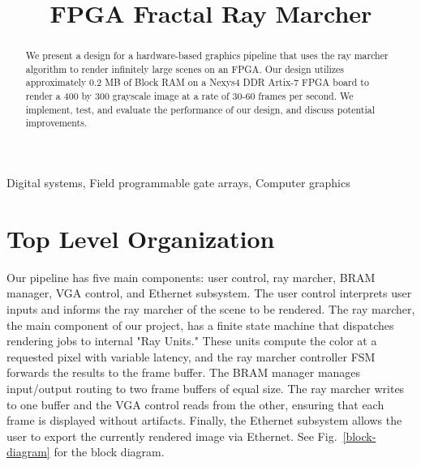 \documentclass[conference]{IEEEtran}
\begin{document}
\title{FPGA Fractal Ray Marcher}

\author{
\and
{}
}

\maketitle

\begin{abstract}
We present a design for a hardware-based graphics pipeline that uses the ray marcher algorithm to render infinitely large scenes on an FPGA. Our design utilizes approximately 0.2 MB of Block RAM on a Nexys4 DDR Artix-7 FPGA board to render a 400 by 300 grayscale image at a rate of 30-60 frames per second. We implement, test, and evaluate the performance of our design, and discuss potential improvements.
\end{abstract}

\begin{IEEEkeywords}
Digital systems, Field programmable gate arrays, Computer graphics
\end{IEEEkeywords}


\section{Top Level Organization}

Our pipeline has five main components: user control, ray marcher, BRAM manager, VGA control, and Ethernet subsystem. The user control interprets user inputs and informs the ray marcher of the scene to be rendered. The ray marcher, the main component of our project, has a finite state machine that dispatches rendering jobs to internal "Ray Units." These units compute the color at a requested pixel with variable latency, and the ray marcher controller FSM forwards the results to the frame buffer. The BRAM manager manages input/output routing to two frame buffers of equal size. The ray marcher writes to one buffer and the VGA control reads from the other, ensuring that each frame is displayed without artifacts. Finally, the Ethernet subsystem allows the user to export the currently rendered image via Ethernet. See Fig.~\ref{block-diagram} for the block diagram.
\end{document}
